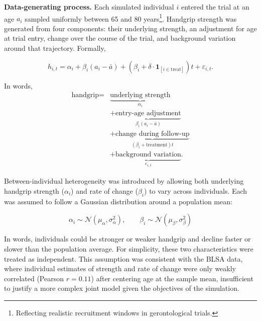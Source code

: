 \documentclass[twocolumn]{article} %
\begin{document}
\textbf{Data-generating process.} Each simulated individual $i$ entered the trial at an age $a_i$ sampled uniformly between 65 and 80 years\footnote{Reflecting realistic recruitment windows in gerontological trials.}. Handgrip strength was generated from four components: their underlying strength, an adjustment for age at trial entry, change over the course of the trial, and background variation around that trajectory. Formally,

$$
h_{i,t} = \alpha_i + \beta_i(a_i - \bar{a}) +
(\beta_i + \delta \cdot \mathbf{1}_{[i \in \mathrm{treat}]})t +
\varepsilon_{i,t}.
$$

In words,
\[
\begin{aligned}
	\text{handgrip} = {}&
	\underbrace{\text{underlying strength}}_{\alpha_i} \\
	&+ \underbrace{\text{entry-age adjustment}}_{\beta_i(a_i-\bar a)} \\
	&+ \underbrace{\text{change during follow-up}}_{(\beta_i+\text{treatment})t} \\
	&+ \underbrace{\text{background variation}}_{\varepsilon_{i,t}}.
\end{aligned}
\]

Between-individual heterogeneity was introduced by allowing both underlying handgrip strength ($\alpha_i$) and rate of change ($\beta_i$) to vary across individuals. Each was assumed to follow a Gaussian distribution around a population mean:

$$\alpha_i \sim \mathcal{N}(\mu_\alpha, \sigma^2_\alpha), \qquad \beta_i \sim \mathcal{N}(\mu_\beta, \sigma^2_\beta)$$

In words, individuals could be stronger or weaker handgrip and decline faster or slower than the population average. For simplicity, these two characteristics were treated as independent. This assumption was consistent with the BLSA data, where individual estimates of strength and rate of change were only weakly correlated (Pearson $r = 0.11$) after centering age at the sample mean, insufficient to justify a more complex joint model given the objectives of the simulation.
\end{document}
